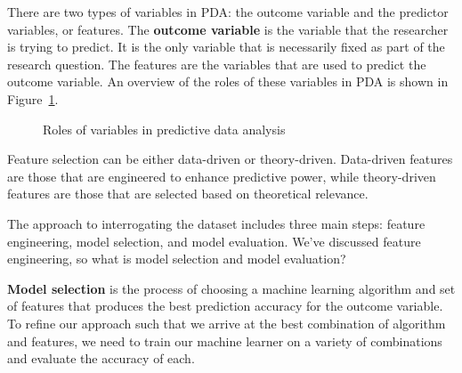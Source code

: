 \documentclass[
  letterpaper,
  krantz1]{latex/krantz-mod}
\theoremstyle{definition}
\theoremstyle{definition}
\theoremstyle{remark}
\begin{document}
There are two types of variables in PDA: the outcome variable and the
predictor variables, or features. The \textbf{outcome
variable} is the variable that the researcher is
trying to predict. It is the only variable that is necessarily fixed as
part of the research question. The features are
the variables that are used to predict the outcome variable. An overview
of the roles of these variables in PDA is shown in
Figure~\ref{fig-pda-variables}.

\begin{figure}[!htb]


\caption{\label{fig-pda-variables}Roles of variables in predictive data
analysis}

\end{figure}%

Feature selection can be either data-driven or
theory-driven. Data-driven features are those that are engineered to
enhance predictive power, while theory-driven features are those that
are selected based on theoretical relevance.

The approach to interrogating the dataset includes three main steps:
feature engineering, model selection, and model evaluation. We've
discussed feature engineering, so what is model selection and model
evaluation?

\textbf{Model selection} is the process of
choosing a machine learning algorithm and set of
features that produces the best prediction accuracy for the outcome
variable. To refine our approach such that we arrive at the best
combination of algorithm and features, we need to train our machine
learner on a variety of combinations and evaluate the accuracy of each.
\end{document}
